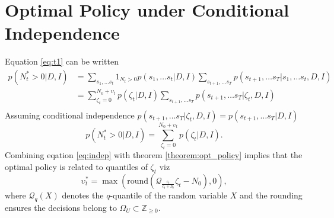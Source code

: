 \documentclass[a4paper,12pt]{article}
\begin{document}
	
	\section{Optimal Policy under Conditional Independence}
	Equation \eqref{eq:t1} can be written
	\begin{equation}
		\begin{split}
			p(N_t^* > 0 | D, I) &= \sum_{s_1,\dots s_t}1_{N_{t}> 0}p(s_1,\dots s_t|D,I)\sum_{s_{t+1},\dots s_T}p(s_{t+1},\dots s_T|s_1,\dots s_t,D,I)\\
			& = \sum_{\zeta_t=0}^{N_0+\upsilon_t}p(\zeta_t|D,I)\sum_{s_{t+1},\dots s_T}p(s_{t+1},\dots s_T|\zeta_t,D,I)\\
		\end{split}
	\end{equation}
	Assuming conditional independence $p(s_{t+1},\dots s_T|\zeta_t,D,I)=p(s_{t+1},\dots s_T|D,I)$
	\begin{equation}
			p(N_t^* > 0 | D, I)  = \sum_{\zeta_t=0}^{N_0+\upsilon_t}p(\zeta_t|D,I).
			\label{eq:indep}
	\end{equation}
	Combining eqation \eqref{eq:indep} with theorem \ref{theorem:opt_policy} implies that the optimal policy is related to quantiles of $\zeta_t$ viz
	\begin{equation}
		\upsilon_t^* = \max(\text{round}(\mathcal{Q}_{\frac{c_t}{c_t+h_t}}\zeta_t-N_0),0),
		\label{eq:opt}
	\end{equation}
	where $\mathcal{Q}_q(X)$ denotes the $q$-quantile of the random variable $X$ and the rounding ensures the decisions belong to $\Omega_U\subset \mathbb{Z}_{\geq 0}$. 
	
\end{document}
